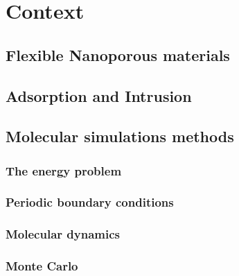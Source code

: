 \documentclass[thesis]{subfiles}
\begin{document}
\chapter{Context}

\section{Flexible Nanoporous materials}

\section{Adsorption and Intrusion}

\section{Molecular simulations methods}

\subsection{The energy problem}

\subsection{Periodic boundary conditions}

\subsection{Molecular dynamics}

\subsection{Monte Carlo}
\end{document}

